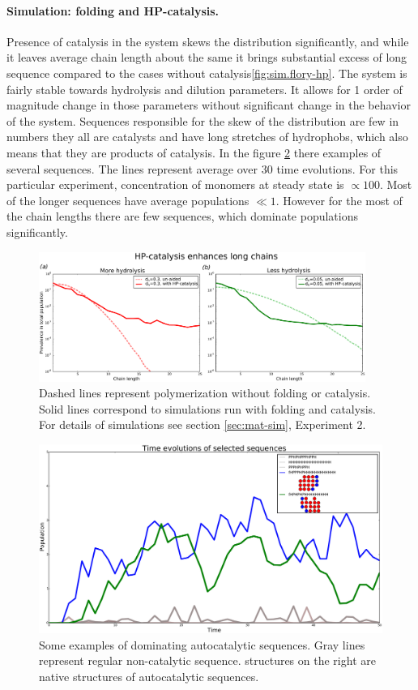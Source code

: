 \documentclass[twoside,twocolumn,9pt]{article}
\begin{document}
\paragraph{Simulation: folding and HP-catalysis.}Presence of catalysis in the system skews the 
distribution significantly, and while it leaves average chain length about the same it brings 
substantial excess of long sequence compared to the cases without catalysis\ref{fig:sim.flory-hp}. 
The system is fairly stable towards hydrolysis and dilution parameters. It allows for 1 order of 
magnitude change in those parameters without significant change in the behavior of the system. 
Sequences responsible for the skew of the distribution are few in numbers they all are catalysts 
and have long stretches of hydrophobs, which also means that they are products of catalysis. In 
the figure \ref{fig:example1} there examples of several sequences. The lines represent average 
over 30 time evolutions. For this particular experiment, concentration of monomers at steady 
state is $\propto 100$. Most of the longer sequences have average populations $\ll 1$. However for 
the most of the chain lengths there are few sequences, which dominate populations significantly.
\begin{figure}[h!]
  \centering
  \includegraphics[width=0.95\textwidth]{pictures/flory-and-hp.pdf} 
  \caption{Dashed lines represent polymerization without folding or catalysis. Solid lines 
correspond to simulations run with folding and catalysis. For details of simulations see 
section \ref{sec:mat-sim}, Experiment 2. }
  \label{fig:sim.flory-fold}
\end{figure}
\begin{figure}[h!]
  \centering
  \includegraphics[width=\columnwidth]{pictures/example1.pdf} 
  \caption{Some examples of dominating autocatalytic sequences. Gray lines represent regular 
non-catalytic sequence. structures on the right are native structures of autocatalytic sequences. }
  \label{fig:example1}
\end{figure}
\end{document}
